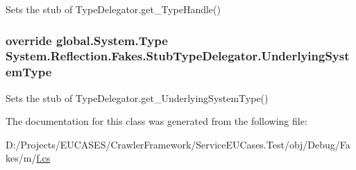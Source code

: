 Sets the stub of Type\-Delegator.\-get\-\_\-\-Type\-Handle()

\hypertarget{class_system_1_1_reflection_1_1_fakes_1_1_stub_type_delegator_a65d45ec428af32aa7495972a509bc7ea}{
\subsubsection[{Underlying\-System\-Type}]{\setlength{\rightskip}{0pt plus 5cm}override global.\-System.\-Type System.\-Reflection.\-Fakes.\-Stub\-Type\-Delegator.\-Underlying\-System\-Type\hspace{0.3cm}{\ttfamily [get]}}}\label{class_system_1_1_reflection_1_1_fakes_1_1_stub_type_delegator_a65d45ec428af32aa7495972a509bc7ea}


Sets the stub of Type\-Delegator.\-get\-\_\-\-Underlying\-System\-Type()



The documentation for this class was generated from the following file\-:\begin{DoxyCompactItemize}
\item 
D\-:/\-Projects/\-E\-U\-C\-A\-S\-E\-S/\-Crawler\-Framework/\-Service\-E\-U\-Cases.\-Test/obj/\-Debug/\-Fakes/m/\hyperlink{m_2f_8cs}{f.\-cs}\end{DoxyCompactItemize}
